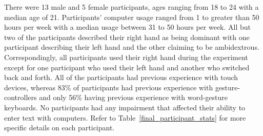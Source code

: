 There were 13 male and 5 female participants, ages ranging from 18 to 24 with a median age of 21. Participants' computer usage ranged from 1 to greater than 50 hours per week with a median usage between 31 to 50 hours per week. All but two of the participants described their right hand as being dominant with one participant describing their left hand and the other claiming to be ambidextrous. Correspondingly, all participants used their right hand during the experiment except for one participant who used their left hand and another who switched back and forth. All of the participants had previous experience with touch devices, whereas 83\% of participants had previous experience with gesture-controllers and only 56\% having previous experience with word-gesture keyboards. No participants had any impairment that affected their ability to enter text with computers. Refer to Table~\ref{final_participant_stats} for more specific details on each participant.

